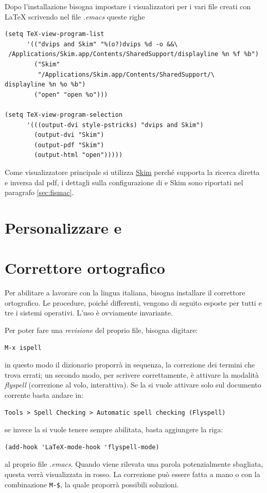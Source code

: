 \documentclass[10pt,a4paper]{article}
\begin{document}
Dopo l'installazione bisogna impostare i visualizzatori per i vari
file creati con \LaTeX{} scrivendo nel file \emph{.emacs} queste righe
\begin{verbatim}
(setq TeX-view-program-list
      '(("dvips and Skim" "%(o?)dvips %d -o &&\
 /Applications/Skim.app/Contents/SharedSupport/displayline %n %f %b")
        ("Skim"
         "/Applications/Skim.app/Contents/SharedSupport/\
displayline %n %o %b")
        ("open" "open %o")))

(setq TeX-view-program-selection 
      '(((output-dvi style-pstricks) "dvips and Skim")
        (output-dvi "Skim")
        (output-pdf "Skim")
        (output-html "open")))))
\end{verbatim}
Come visualizzatore principale si utilizza
\href{http://skim-app.sourceforge.net/}{Skim} perché supporta la
ricerca diretta e inversa dal pdf, i dettagli sulla configurazione di
\emacs e Skim sono riportati nel paragrafo \ref{sec:fismac}.

\section{Personalizzare \emacs{} e \auctex}
\label{sec:personal}

\textcolor{red!50}{\lipsum[1]}

\section{Correttore ortografico}
\label{sec:corr}
Per abilitare \emacs{} a lavorare con la lingua italiana, bisogna
installare il correttore ortografico. Le procedure, poiché differenti,
vengono di seguito esposte per tutti e tre i sistemi operativi. 
L'uso è ovviamente invariante. 

Per poter fare una \emph{revisione} del proprio file, bisogna digitare:
\begin{Verbatim}
M-x ispell
\end{Verbatim}
in questo modo il dizionario proporrà in sequenza, la correzione
dei termini che trova errati; un secondo modo, per scrivere
correttamente, è attivare la modalità \emph{flyspell} (correzione al
volo, interattiva). Se la si vuole
attivare solo sul documento corrente basta andare in:
\begin{Verbatim}
Tools > Spell Checking > Automatic spell checking (Flyspell)
\end{Verbatim}
se invece la si vuole tenere sempre abilitata,
basta aggiungere la riga:
\begin{Verbatim}
(add-hook 'LaTeX-mode-hook 'flyspell-mode)
\end{Verbatim}
al proprio file \emph{.emacs}. Quando viene rilevata una parola
potenzialmente sbagliata, questa verrà visualizzata in rosso. La
correzione può essere fatta a mano o con la combinazione \verb!M-$!,
la quale proporrà possibili soluzioni.
\end{document}
